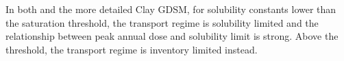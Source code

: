 In both \Cyder and the more detailed Clay \gls{GDSM}, for solubility constants
lower than the saturation threshold, the transport regime is solubility
limited and the relationship between peak annual dose and solubility limit is
strong.  Above the threshold, the transport regime is inventory limited
instead.


